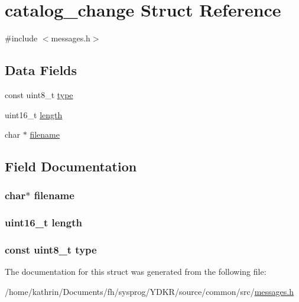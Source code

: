 \hypertarget{structcatalog__change}{
\section{catalog\_\-change Struct Reference}
\label{structcatalog__change}
}


{\ttfamily \#include $<$messages.h$>$}

\subsection*{Data Fields}
\begin{DoxyCompactItemize}
\item 
const uint8\_\-t \hyperlink{structcatalog__change_aca7dafb0092715a03dd40f45fc607f2a}{type}
\item 
uint16\_\-t \hyperlink{structcatalog__change_a1892eba2086d12ac2b09005aeb09ea3b}{length}
\item 
char $\ast$ \hyperlink{structcatalog__change_aeac90097f29f7529968697163cea5c18}{filename}
\end{DoxyCompactItemize}


\subsection{Field Documentation}
\hypertarget{structcatalog__change_aeac90097f29f7529968697163cea5c18}{
\subsubsection[{filename}]{\setlength{\rightskip}{0pt plus 5cm}char$\ast$ {\bf filename}}}
\label{structcatalog__change_aeac90097f29f7529968697163cea5c18}
\hypertarget{structcatalog__change_a1892eba2086d12ac2b09005aeb09ea3b}{
\subsubsection[{length}]{\setlength{\rightskip}{0pt plus 5cm}uint16\_\-t {\bf length}}}
\label{structcatalog__change_a1892eba2086d12ac2b09005aeb09ea3b}
\hypertarget{structcatalog__change_aca7dafb0092715a03dd40f45fc607f2a}{
\subsubsection[{type}]{\setlength{\rightskip}{0pt plus 5cm}const uint8\_\-t {\bf type}}}
\label{structcatalog__change_aca7dafb0092715a03dd40f45fc607f2a}


The documentation for this struct was generated from the following file:\begin{DoxyCompactItemize}
\item 
/home/kathrin/Documents/fh/sysprog/YDKR/source/common/src/\hyperlink{messages_8h}{messages.h}\end{DoxyCompactItemize}
